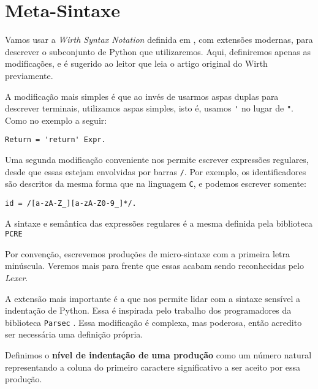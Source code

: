 \section{Meta-Sintaxe}

Vamos usar a \textit{Wirth Syntax Notation}
definida em \cite{wirth1977WSN}, com extensões
modernas, para descrever o subconjunto de Python que
utilizaremos. Aqui, definiremos apenas as modificações,
e é sugerido ao leitor que leia o artigo
original do Wirth previamente.

A modificação mais simples é que ao invés de usarmos
aspas duplas para descrever terminais, utilizamos aspas
simples, isto é, usamos \verb|'| no lugar de \verb|"|.
Como no exemplo a seguir:

\begin{lstlisting}
Return = 'return' Expr.
\end{lstlisting}

Uma segunda modificação conveniente nos permite
escrever expressões regulares, desde que essas estejam
envolvidas por barras \verb|/|. Por exemplo, os
identificadores são descritos da mesma forma que
na linguagem \texttt{C}, e podemos escrever somente:

\begin{lstlisting}
id = /[a-zA-Z_][a-zA-Z0-9_]*/.
\end{lstlisting}

\noindent A sintaxe e semântica
das expressões regulares é a mesma definida
pela biblioteca \texttt{PCRE} \cite{pcre_syntax}

Por convenção, escrevemos produções de micro-sintaxe
com a primeira letra minúscula. Veremos mais para frente
que essas acabam sendo reconhecidas pelo \textit{Lexer}.

A extensão mais importante é a que nos permite lidar com
a sintaxe sensível a indentação de Python.
Essa é inspirada pelo trabalho dos programadores 
da biblioteca \texttt{Parsec} \cite{adams2014indentation}.
Essa modificação é complexa, mas poderosa, então
acredito ser necessária uma definição própria.

\begin{Def}
Definimos o \textbf{nível de indentação de uma produção}
como um número natural
representando a coluna do primeiro caractere significativo
a ser aceito por essa produção.
\end{Def}

